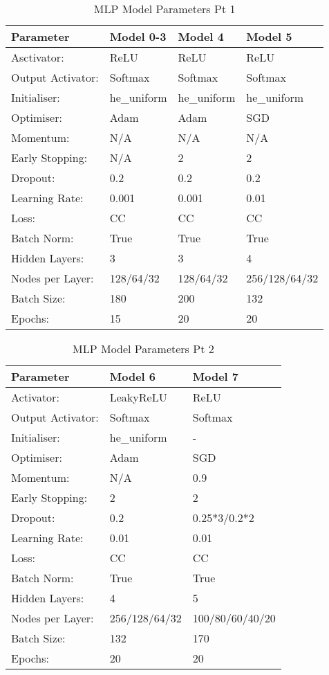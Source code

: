 \medskip
\begin{table}[H]
\centering
\caption{MLP Model Parameters Pt 1}
\label{tab:mlp-models-1}
\begin{tabular}{llll}
\hline
Parameter & Model 0-3 & Model 4 & Model 5 \\ \hline
Asctivator: & ReLU & ReLU & ReLU \\
Output Activator: & Softmax & Softmax & Softmax \\
Initialiser: & he\_uniform & he\_uniform & he\_uniform \\
Optimiser: & Adam & Adam & SGD \\
Momentum: & N/A & N/A & N/A \\
Early Stopping: & N/A & 2 & 2 \\
Dropout: & 0.2 & 0.2 & 0.2 \\
Learning Rate: & 0.001 & 0.001 & 0.01 \\
Loss: & CC & CC & CC \\
Batch Norm: & True & True & True \\
Hidden Layers: & 3 & 3 & 4 \\
Nodes per Layer: & 128/64/32 & 128/64/32 & 256/128/64/32 \\
Batch Size: & 180 & 200 & 132 \\
Epochs: & 15 & 20 & 20 \\ \hline
\end{tabular}
\end{table}

\begin{table}[H]
\centering
\caption{MLP Model Parameters Pt 2}
\label{tab:mlp-models-2}
\begin{tabular}{lll}
\hline
Parameter         & Model 6       & Model 7         \\ \hline
Activator:        & LeakyReLU     & ReLU            \\
Output Activator: & Softmax       & Softmax         \\
Initialiser:      & he\_uniform   & -               \\
Optimiser:        & Adam          & SGD             \\
Momentum:         & N/A           & 0.9             \\
Early Stopping:   & 2             & 2               \\
Dropout:          & 0.2           & 0.25*3/0.2*2    \\
Learning Rate:    & 0.01          & 0.01            \\
Loss:             & CC            & CC              \\
Batch Norm:       & True          & True            \\
Hidden Layers:    & 4             & 5               \\
Nodes per Layer:  & 256/128/64/32 & 100/80/60/40/20 \\
Batch Size:       & 132           & 170             \\
Epochs:           & 20            & 20              \\ \hline
\end{tabular}
\end{table}
